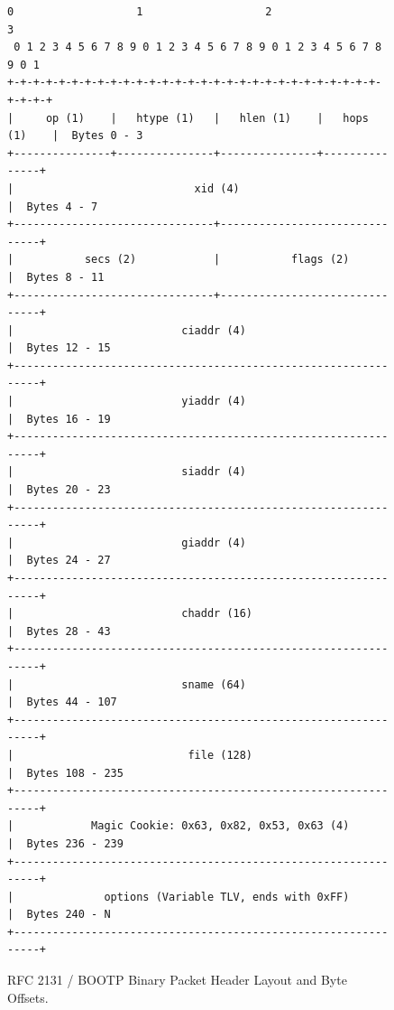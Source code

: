 \documentclass[11pt,a4paper]{article}
\begin{document}
\begin{figure}[H]
\centering
\begin{lstlisting}[numbers=none, frame=none, backgroundcolor=\color{white}, basicstyle=\ttfamily\scriptsize]
 0                   1                   2                   3
 0 1 2 3 4 5 6 7 8 9 0 1 2 3 4 5 6 7 8 9 0 1 2 3 4 5 6 7 8 9 0 1
+-+-+-+-+-+-+-+-+-+-+-+-+-+-+-+-+-+-+-+-+-+-+-+-+-+-+-+-+-+-+-+-+
|     op (1)    |   htype (1)   |   hlen (1)    |   hops (1)    |  Bytes 0 - 3
+---------------+---------------+---------------+---------------+
|                            xid (4)                            |  Bytes 4 - 7
+-------------------------------+-------------------------------+
|           secs (2)            |           flags (2)           |  Bytes 8 - 11
+-------------------------------+-------------------------------+
|                          ciaddr (4)                           |  Bytes 12 - 15
+---------------------------------------------------------------+
|                          yiaddr (4)                           |  Bytes 16 - 19
+---------------------------------------------------------------+
|                          siaddr (4)                           |  Bytes 20 - 23
+---------------------------------------------------------------+
|                          giaddr (4)                           |  Bytes 24 - 27
+---------------------------------------------------------------+
|                          chaddr (16)                          |  Bytes 28 - 43
+---------------------------------------------------------------+
|                          sname (64)                           |  Bytes 44 - 107
+---------------------------------------------------------------+
|                           file (128)                          |  Bytes 108 - 235
+---------------------------------------------------------------+
|            Magic Cookie: 0x63, 0x82, 0x53, 0x63 (4)           |  Bytes 236 - 239
+---------------------------------------------------------------+
|              options (Variable TLV, ends with 0xFF)           |  Bytes 240 - N
+---------------------------------------------------------------+
\end{lstlisting}
\caption{RFC 2131 / BOOTP Binary Packet Header Layout and Byte Offsets.}
\label{fig:bootp_layout}
\end{figure}
\end{document}
